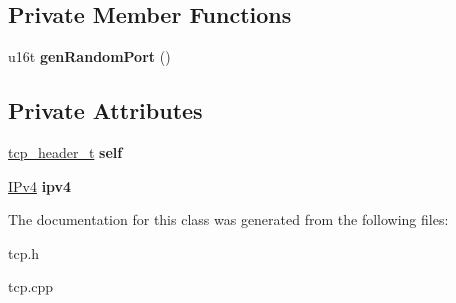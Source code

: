 \subsection*{Private Member Functions}
\begin{DoxyCompactItemize}
\item 
\mbox{\label{classTcp_a5f8fee77a1e98bbf3e38419e14cd2b20}} 
u16t {\bfseries gen\+Random\+Port} ()
\end{DoxyCompactItemize}
\subsection*{Private Attributes}
\begin{DoxyCompactItemize}
\item 
\mbox{\label{classTcp_a8d534d9756bb2da25562007ea4f7d892}} 
\hyperlink{structtcp__header__t}{tcp\+\_\+header\+\_\+t} {\bfseries self}
\item 
\mbox{\label{classTcp_af11f1b485c7082948b0c97d4e1fd1fb5}} 
\hyperlink{classIPv4}{I\+Pv4} {\bfseries ipv4}
\end{DoxyCompactItemize}


The documentation for this class was generated from the following files\+:\begin{DoxyCompactItemize}
\item 
tcp.\+h\item 
tcp.\+cpp\end{DoxyCompactItemize}
